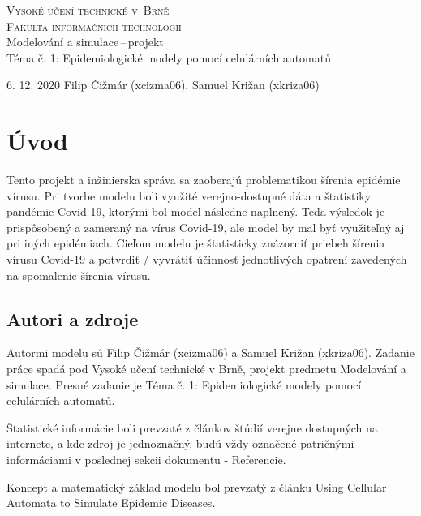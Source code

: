 \documentclass[12pt,a4paper,titlepage]{article}
\begin{document}
\begin{titlepage}
\begin{center}
    {\textsc{\Huge Vysoké učení technické v~Brně}}\\
    \smallskip
    {\huge\textsc{Fakulta informačních technologií}}\\
    \bigskip
    \LARGE{Modelování a simulace\,--\,projekt}\\
    \smallskip
    \Huge{Téma č. 1: Epidemiologické modely pomocí celulárních automatů}\\
\end{center}
    { 6. 12. 2020 \hfill Filip Čižmár (xcizma06), Samuel Križan (xkriza06) }
\end{titlepage}


\setlength{\parskip}{0pt}
\tableofcontents
\setlength{\parskip}{0pt}

\newpage


\section{Úvod}
Tento projekt a inžinierska správa sa zaoberajú problematikou šírenia epidémie vírusu. Pri tvorbe modelu boli využité verejno-dostupné dáta a štatistiky pandémie Covid-19, ktorými bol model následne naplnený. Teda výsledok je prispôsobený a zameraný na vírus Covid-19, ale model by mal byť využiteľný aj pri iných epidémiach.
Cieľom modelu je štatisticky znázorniť priebeh šírenia vírusu Covid-19 a potvrdiť / vyvrátiť účinnosť jednotlivých opatrení zavedených na spomalenie šírenia vírusu.


\subsection{Autori a zdroje}
Autormi modelu sú Filip Čižmár (xcizma06) a Samuel Križan (xkriza06). Zadanie práce spadá pod Vysoké učení technické v Brně, projekt predmetu Modelování a simulace. Presné zadanie je Téma č. 1: Epidemiologické modely pomocí celulárních automatů. \cite{Zadanie}

Štatistické informácie boli prevzaté z článkov štúdií verejne dostupných na internete, a kde zdroj je jednoznačný, budú vždy označené patričnými informáciami v poslednej sekcii dokumentu - Referencie.

Koncept a matematický základ modelu bol prevzatý z článku Using Cellular Automata to Simulate Epidemic Diseases\cite{Zdroj}.
\end{document}
